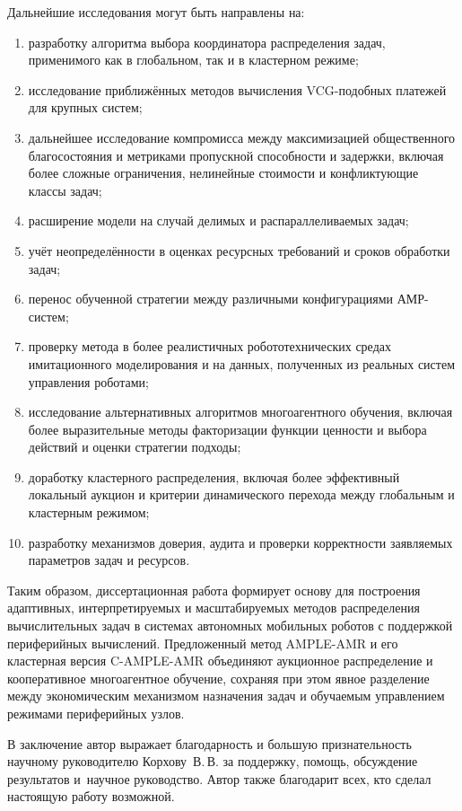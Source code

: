 Дальнейшие исследования могут быть направлены на:
\begin{enumerate}
	\item разработку алгоритма выбора координатора распределения задач, применимого как в глобальном, так и в кластерном режиме;
	\item исследование приближённых методов вычисления VCG-подобных платежей для крупных систем;
	\item дальнейшее исследование компромисса между максимизацией общественного благосостояния и метриками пропускной способности и задержки, включая более сложные ограничения, нелинейные стоимости и конфликтующие классы задач;
	\item расширение модели на случай делимых и распараллеливаемых задач;
	\item учёт неопределённости в оценках ресурсных требований и сроков обработки задач;
	\item перенос обученной стратегии между различными конфигурациями АМР-систем;
	\item проверку метода в более реалистичных робототехнических средах имитационного моделирования и на данных, полученных из реальных систем управления роботами;
	\item исследование альтернативных алгоритмов многоагентного обучения, включая более выразительные методы факторизации функции ценности и выбора действий и оценки стратегии подходы;
	\item доработку кластерного распределения, включая более эффективный локальный аукцион и критерии динамического перехода между глобальным и кластерным режимом;
	\item разработку механизмов доверия, аудита и проверки корректности заявляемых параметров задач и ресурсов.
\end{enumerate}

Таким образом, диссертационная работа формирует основу для построения адаптивных, интерпретируемых и масштабируемых методов распределения вычислительных задач в системах автономных мобильных роботов с поддержкой периферийных вычислений. Предложенный метод AMPLE-AMR и его кластерная версия C-AMPLE-AMR объединяют аукционное распределение и кооперативное многоагентное обучение, сохраняя при этом явное разделение между экономическим механизмом назначения задач и обучаемым управлением режимами периферийных узлов.

В заключение автор выражает благодарность и большую признательность научному руководителю Корхову~В.\,В. за поддержку, помощь, обсуждение результатов и~научное руководство. Автор также благодарит всех, кто сделал настоящую работу возможной.

\nocite{*}
